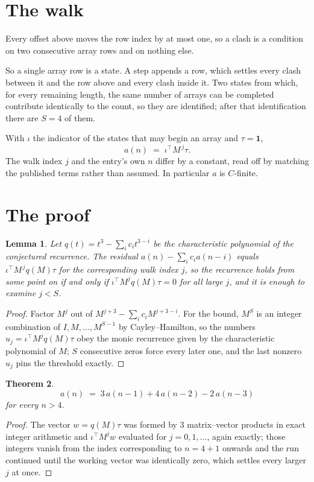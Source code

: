 \documentclass[11pt,a4paper]{article}
\theoremstyle{plain}
\newtheorem{theorem}{Theorem}
\newtheorem{lemma}[theorem]{Lemma}
\theoremstyle{definition}
\begin{document}
\section{The walk}

Every offset above moves the row index by at most one, so a clash is a condition on two
consecutive array rows and on nothing else.

So a single array row is a state. A step appends a row, which settles every clash between it
and the row above and every clash inside it. Two states from which, for every remaining length,
the same number of arrays can be completed contribute identically to the count, so they are
identified; after that identification there are $S=4$ of them.

With $\iota$ the indicator of the states that may begin an array and $\tau=\mathbf{1}$,
\[
a(n)\;=\;\iota^{\!\top}M^{\,j}\tau .
\]
The walk index $j$ and the entry's own $n$ differ by a constant, read off by matching the
published terms rather than assumed. In particular $a$ is $C$-finite.

\section{The proof}

\begin{lemma}\label{lem:crit}
Let $q(t)=t^{3}-\sum_i c_it^{3-i}$ be the characteristic polynomial of the
conjectured recurrence. The residual $a(n)-\sum_ic_ia(n-i)$ equals
$\iota^{\!\top}M^{\,j}q(M)\tau$ for the corresponding walk index $j$, so the recurrence
holds from some point on if and only if $\iota^{\!\top}M^{j}q(M)\tau=0$ for all large $j$,
and it is enough to examine $j<S$.
\end{lemma}

\begin{proof}
Factor $M^{j}$ out of $M^{j+3}-\sum_ic_iM^{j+3-i}$. For the bound, $M^{S}$
is an integer combination of $I,M,\dots,M^{S-1}$ by Cayley--Hamilton, so the numbers
$u_j=\iota^{\!\top}M^{j}q(M)\tau$ obey the monic recurrence given by the characteristic
polynomial of $M$; $S$ consecutive zeros force every later one, and the last nonzero $u_j$
pins the threshold exactly.
\end{proof}

\begin{theorem}
\[
a(n)\;=\;3\,a(n-1) + 4\,a(n-2) - 2\,a(n-3)
\]
for every $n>4$.
\end{theorem}

\begin{proof}
The vector $w=q(M)\tau$ was formed by $3$ matrix--vector products in exact integer
arithmetic and $\iota^{\!\top}M^{j}w$ evaluated for $j=0,1,\dots$, again exactly; those
integers vanish from the index corresponding to $n=4+1$ onwards and the run continued
until the working vector was identically zero, which settles every larger $j$ at once.
\end{proof}
\end{document}

